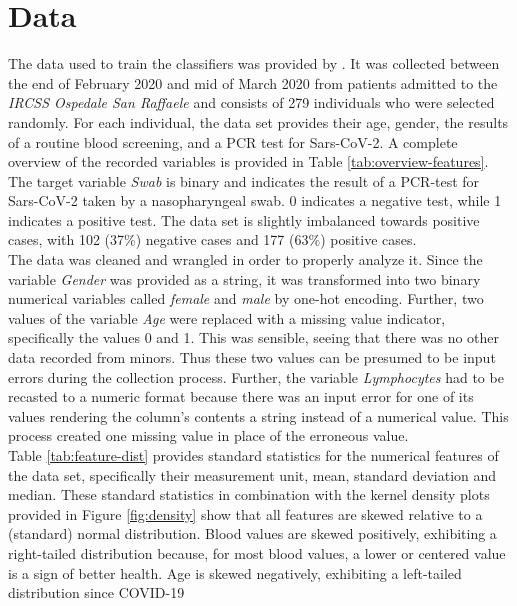 \section{Data}
The data used to train the classifiers was provided by 
\citeauthor{RN127} \cite{RN127}. 
It was collected between the end of February 2020 and mid of March 2020 from 
patients admitted to the \textit{IRCSS Ospedale San Raffaele} and consists of 
279 individuals who were selected randomly.
For each individual, the data set provides their age, gender, the results of a 
routine blood screening, and a PCR test for Sars-CoV-2.
A complete overview of the recorded variables is provided in Table 
\ref{tab:overview-features}. The target variable \textit{Swab} is binary and 
indicates the result of a PCR-test for Sars-CoV-2 taken by a nasopharyngeal 
swab. 0 indicates a negative test, while 1 indicates a positive test.
The data set is slightly imbalanced towards positive cases, with 102 (37\%) 
negative cases and 177 (63\%) positive cases.
\\
The data was cleaned and wrangled in order to properly analyze it.
Since the variable \textit{Gender} 
was provided as a string, it was transformed into two binary numerical 
variables called \textit{female} and \textit{male} by one-hot encoding.
Further, two values of the variable \textit{Age} were replaced with a missing 
value indicator, specifically 
the values 0 and 1. This was sensible, seeing that there was no other 
data recorded from minors. Thus these two values can 
be presumed to be input errors during the collection process.
Further, the variable \textit{Lymphocytes} had to be recasted to a numeric 
format because there was an input error for one of its 
values rendering the column's contents a string instead of a numerical 
value. This process created one missing value in place of the erroneous value.
\\
Table \ref{tab:feature-dist} provides standard statistics for the numerical 
features of the data set, specifically their measurement unit, mean, standard 
deviation and median.
These standard statistics in combination with the kernel density plots 
provided in Figure \ref{fig:density} show that all features are skewed 
relative to a (standard) normal distribution. Blood values are 
skewed positively, exhibiting a right-tailed distribution because, for most 
blood values, a lower or centered value is a sign of better health. Age 
is skewed negatively, exhibiting a left-tailed distribution since COVID-19 
